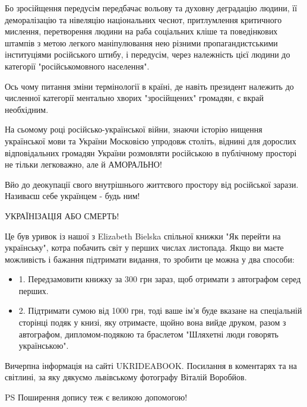 Бо зросійщення передусім передбачає вольову та духовну деградацію людини, її
деморалізацію та нівеляцію національних чеснот, притлумлення критичного
мислення, перетворення людини на раба соціальних кліше та поведінкових штампів
з метою легкого маніпулювання нею різними пропагандистськими інституціями
російського штибу, і передусім, через належність цієї людини до категорії
"російськомовного населення". 

Ось чому питання зміни термінології в країні, де навіть президент належить до
численної категорії ментально хворих  "зросійщених" громадян, є вкрай
необхідним. 

На сьомому році російсько-української війни, знаючи історію нищення української
мови та України Московією упродовж століть, віднині для дорослих відповідальних
громадян України  розмовляти російською в публічному просторі не тільки
легковажно, але й АМОРАЛЬНО!

Вйо до деокупації свого внутрішнього життєвого простору від російської зарази.
Називаєш себе українцем - будь ним!

УКРАЇНІЗАЦІЯ АБО СМЕРТЬ!

Це був уривок із нашої з Elizabeth Bielska спільної книжки "Як перейти на
українську", котра побачить світ у перших числах листопада.  Якщо ви маєте
можливість і бажання підтримати видання, то зробити це можна у два способи:

\begin{itemize}
\item 1. Передзамовити книжку за 300 грн зараз, щоб отримати з автографом серед перших.
\item 2. Підтримати сумою від 1000 грн, тоді ваше ім'я буде вказане на спеціальній
сторінці подяк у книзі, яку отримаєте, щойно вона вийде друком, разом з
автографом, дипломом-подякою та браслетом "Шляхетні люди говорять українською".
\end{itemize}

Вичерпна інформація на сайті UKRIDEABOOK. Посилання в коментарях та на
світлині, за яку дякуємо львівському фотографу Віталій Воробйов.

PS Поширення допису теж є великою допомогою! 🙂

